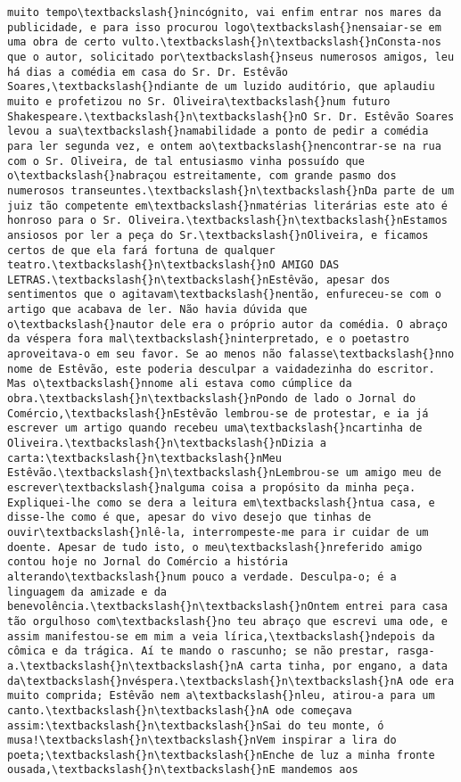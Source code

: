 \begin{Verbatim}[commandchars=\\\{\}]
muito tempo\textbackslash{}nincógnito, vai enfim entrar nos mares da publicidade, e para isso procurou logo\textbackslash{}nensaiar-se em uma obra de certo vulto.\textbackslash{}n\textbackslash{}nConsta-nos que o autor, solicitado por\textbackslash{}nseus numerosos amigos, leu há dias a comédia em casa do Sr. Dr. Estêvão Soares,\textbackslash{}ndiante de um luzido auditório, que aplaudiu muito e profetizou no Sr. Oliveira\textbackslash{}num futuro Shakespeare.\textbackslash{}n\textbackslash{}nO Sr. Dr. Estêvão Soares levou a sua\textbackslash{}namabilidade a ponto de pedir a comédia para ler segunda vez, e ontem ao\textbackslash{}nencontrar-se na rua com o Sr. Oliveira, de tal entusiasmo vinha possuído que o\textbackslash{}nabraçou estreitamente, com grande pasmo dos numerosos transeuntes.\textbackslash{}n\textbackslash{}nDa parte de um juiz tão competente em\textbackslash{}nmatérias literárias este ato é honroso para o Sr. Oliveira.\textbackslash{}n\textbackslash{}nEstamos ansiosos por ler a peça do Sr.\textbackslash{}nOliveira, e ficamos certos de que ela fará fortuna de qualquer teatro.\textbackslash{}n\textbackslash{}nO AMIGO DAS LETRAS.\textbackslash{}n\textbackslash{}nEstêvão, apesar dos sentimentos que o agitavam\textbackslash{}nentão, enfureceu-se com o artigo que acabava de ler. Não havia dúvida que o\textbackslash{}nautor dele era o próprio autor da comédia. O abraço da véspera fora mal\textbackslash{}ninterpretado, e o poetastro aproveitava-o em seu favor. Se ao menos não falasse\textbackslash{}nno nome de Estêvão, este poderia desculpar a vaidadezinha do escritor. Mas o\textbackslash{}nnome ali estava como cúmplice da obra.\textbackslash{}n\textbackslash{}nPondo de lado o Jornal do Comércio,\textbackslash{}nEstêvão lembrou-se de protestar, e ia já escrever um artigo quando recebeu uma\textbackslash{}ncartinha de Oliveira.\textbackslash{}n\textbackslash{}nDizia a carta:\textbackslash{}n\textbackslash{}nMeu Estêvão.\textbackslash{}n\textbackslash{}nLembrou-se um amigo meu de escrever\textbackslash{}nalguma coisa a propósito da minha peça. Expliquei-lhe como se dera a leitura em\textbackslash{}ntua casa, e disse-lhe como é que, apesar do vivo desejo que tinhas de ouvir\textbackslash{}nlê-la, interrompeste-me para ir cuidar de um doente. Apesar de tudo isto, o meu\textbackslash{}nreferido amigo contou hoje no Jornal do Comércio a história alterando\textbackslash{}num pouco a verdade. Desculpa-o; é a linguagem da amizade e da benevolência.\textbackslash{}n\textbackslash{}nOntem entrei para casa tão orgulhoso com\textbackslash{}no teu abraço que escrevi uma ode, e assim manifestou-se em mim a veia lírica,\textbackslash{}ndepois da cômica e da trágica. Aí te mando o rascunho; se não prestar, rasga-a.\textbackslash{}n\textbackslash{}nA carta tinha, por engano, a data da\textbackslash{}nvéspera.\textbackslash{}n\textbackslash{}nA ode era muito comprida; Estêvão nem a\textbackslash{}nleu, atirou-a para um canto.\textbackslash{}n\textbackslash{}nA ode começava assim:\textbackslash{}n\textbackslash{}nSai do teu monte, ó musa!\textbackslash{}n\textbackslash{}nVem inspirar a lira do poeta;\textbackslash{}n\textbackslash{}nEnche de luz a minha fronte ousada,\textbackslash{}n\textbackslash{}nE mandemos aos 
\end{Verbatim}
